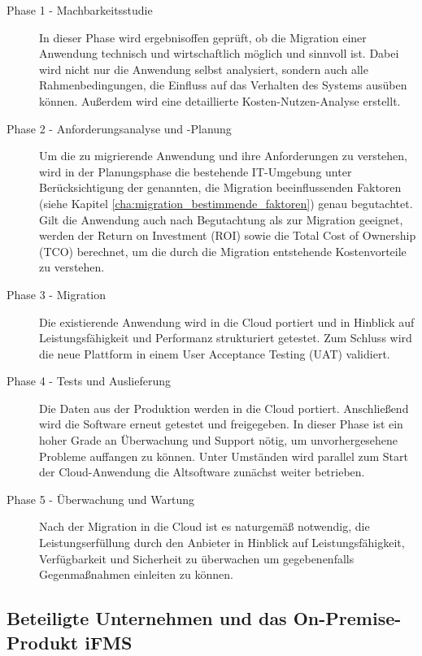 \begin{description}
	\item[Phase 1 - Machbarkeitsstudie] In dieser Phase wird ergebnisoffen
geprüft, ob die Migration einer Anwendung technisch und wirtschaftlich möglich
und sinnvoll ist. Dabei wird nicht nur die Anwendung selbst analysiert, sondern
auch alle Rahmenbedingungen, die Einfluss auf das Verhalten des Systems ausüben
können. Außerdem wird eine detaillierte Kosten-Nutzen-Analyse erstellt.

	\item[Phase 2 - Anforderungsanalyse und -Planung] Um die zu migrierende
Anwendung und ihre Anforderungen zu verstehen, wird in der Planungsphase die
bestehende IT-Umgebung unter Berücksichtigung der genannten, die Migration
beeinflussenden Faktoren (siehe  Kapitel
\ref{cha:migration_bestimmende_faktoren})
genau begutachtet. Gilt die Anwendung auch nach Begutachtung als zur Migration
geeignet, werden der Return on Investment (ROI) sowie die Total Cost of
Ownership (TCO) berechnet, um die durch die Migration entstehende
Kostenvorteile
zu verstehen.

	\item[Phase 3 - Migration] Die existierende Anwendung wird in die Cloud
portiert und in Hinblick auf Leistungsfähigkeit und Performanz strukturiert
getestet. Zum Schluss wird die neue Plattform in einem User Acceptance Testing
(UAT) validiert.

	\item[Phase 4 - Tests und Auslieferung] Die Daten aus der Produktion
werden in die Cloud portiert. Anschließend wird die Software erneut getestet
und freigegeben. In dieser Phase ist ein hoher Grade an Überwachung und Support
nötig, um unvorhergesehene Probleme auffangen zu können. Unter Umständen wird
parallel zum Start der Cloud-Anwendung die Altsoftware zunächst weiter
betrieben.

	\item[Phase 5 - Überwachung und Wartung] Nach der Migration in die
Cloud ist es naturgemäß notwendig, die Leistungserfüllung durch den Anbieter in
Hinblick auf Leistungsfähigkeit, Verfügbarkeit und Sicherheit zu überwachen um
gegebenenfalls Gegenmaßnahmen einleiten zu können.
\end{description}

\subsection{Beteiligte Unternehmen und das On-Premise-Produkt iFMS}
\label{cha:replyundifms}

